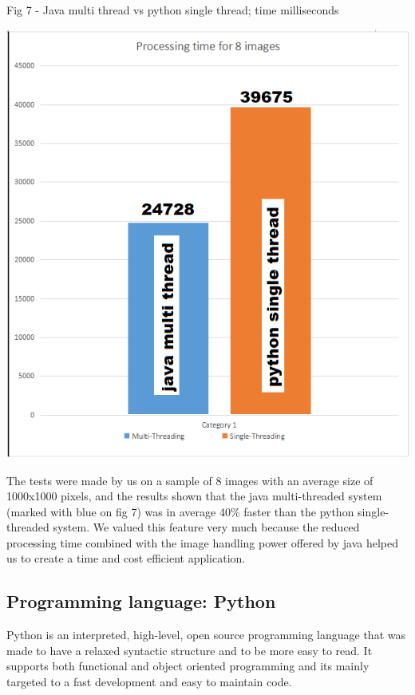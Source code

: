 \documentclass[12pt, a4paper]{report}
\begin{document}
\bigskip

\begin{center}
Fig 7 - Java multi thread vs python single thread; time milliseconds
\end{center}
\par 
\includegraphics[scale=0.7, center]{multi_thread2.png}

\quad
The tests were made by us on a sample of 8 images with an average size of 1000x1000 pixels, and the results shown that the java multi-threaded system (marked with blue on fig 7) was in average 40\% faster than the python single-threaded system. We valued this feature very much because the reduced processing time combined with the image handling power offered by java helped us to create a time and cost efficient application.


\subsection{Programming language: Python}
\medskip

\quad
Python is an interpreted, high-level, open source programming language that was made to have a relaxed syntactic structure and to be more easy to read. It supports both functional and object oriented programming and its mainly targeted to a fast development and easy to maintain code.
\par
\end{document}
